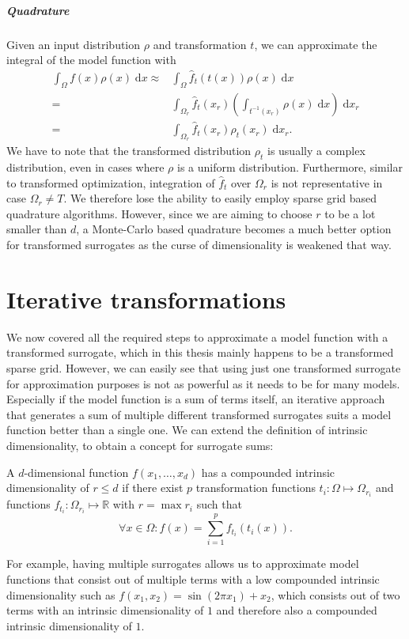 \documentclass[
  a4paper,  %
  twoside,  %
  bibliography=totoc,
  headsepline,
  cleardoublepage=empty,
  parskip=half,
  draft=false
]{scrbook}
\begin{document}
\paragraph{Quadrature}
Given an input distribution $\rho$ and transformation $t$, we can approximate the integral of the model function with
\begin{equation}
\begin{split}
\int_{\Omega} f(x) \rho(x) \; \text{d}x \approx &\int_{\Omega} \hat{f}_t(t(x)) \rho(x) \; \text{d}x\\
=&\int_{\Omega_r} \hat{f}_t(x_r) \left(\int_{t^{-1}(x_r)} \rho(x)  \; \text{d}x \right)  \; \text{d}x_r\\
=&\int_{\Omega_r} \hat{f}_t(x_r) \rho_t(x_r) \; \text{d}x_r.
\end{split}
\end{equation}
We have to note that the transformed distribution $\rho_t$ is usually a complex distribution, even in cases where $\rho$ is a uniform distribution.
Furthermore, similar to transformed optimization, integration of $\hat{f}_t$ over $\Omega_r$ is not representative in case $\Omega_r \neq T$.
We therefore lose the ability to easily employ sparse grid based quadrature algorithms.
However, since we are aiming to choose $r$ to be a lot smaller than $d$, a Monte-Carlo based quadrature becomes a much better option for transformed surrogates as the curse of dimensionality is weakened that way.

\chapter{Iterative transformations}
\label{chap:c5}

We now covered all the required steps to approximate a model function with a transformed surrogate, which in this thesis mainly happens to be a transformed sparse grid.
However, we can easily see that using just one transformed surrogate for approximation purposes is not as powerful as it needs to be for many models.
Especially if the model function is a sum of terms itself, an iterative approach that generates a sum of multiple different transformed surrogates suits a model function better than a single one.
We can extend the definition of intrinsic dimensionality, to obtain a concept for surrogate sums:
\begin{definition}
A $d$-dimensional function $f(x_1, \dots, x_d)$ has a compounded intrinsic dimensionality of $r \leq d$ if there exist $p$ transformation functions $t_i \colon \Omega \mapsto \Omega_{r_i}$ and functions $f_{t_i} \colon \Omega_{r_i} \mapsto \mathds{R}$ with $r=\max r_i$ such that
\begin{equation}
\forall x \in \Omega \colon f(x)=\sum_{i=1}^p f_{t_i}(t_i(x)).
\end{equation}
\label{def:intrinsic_sum}
\end{definition}
%
For example, having multiple surrogates allows us to approximate model functions that consist out of multiple terms with a low compounded intrinsic dimensionality such as $f(x_1, x_2)=\sin(2 \pi x_1) + x_2$, which consists out of two terms with an intrinsic dimensionality of $1$ and therefore also a compounded intrinsic dimensionality of $1$.
\end{document}
